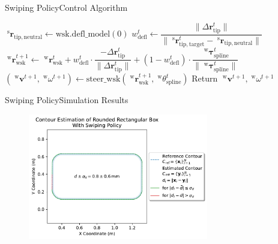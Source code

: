 \documentclass[AIRbeamer
,optEnglish
,optBiber
,optBibstyleAlphabetic
,optBeamerClassicFormat%
]{AIRlatex}
\begin{document}
\begin{frame}{Swiping Policy}{Control Algorithm}
\begin{algorithm}[H]
\begin{algorithmic}[1]
{                    \State \(\;^{\mathrm{s}}\boldsymbol{r}_{\mathrm{tip, neutral}} \gets \mathrm{wsk.defl\_model}(0)\)
                    \State \(w_{\mathrm{defl}}^{t} \gets \dfrac{\|\Delta\boldsymbol{r}_{\mathrm{tip}}^{t}\|}{\|\;^{\mathrm{s}}\boldsymbol{r}_{\mathrm{tip, target}}^{t} - \;^{\mathrm{s}}\boldsymbol{r}_{\mathrm{tip, neutral}}\|}\)
                    \State \colorbox{green!40}{\(\;^{\mathrm{w}}\boldsymbol{r}_{\mathrm{wsk}}^{t+1} \gets \;^{\mathrm{w}}\boldsymbol{r}_{\mathrm{wsk}}^{t} + w_{\mathrm{defl}}^{t} \cdot \dfrac{-\Delta\boldsymbol{r}_{\mathrm{tip}}^{t}}{\|\Delta\boldsymbol{r}_{\mathrm{tip}}^{t}\|} + (1 - w_{\mathrm{defl}}^{t}) \cdot \dfrac{\;^{\mathrm{w}}\boldsymbol{\tau}_{\mathrm{spline}}^{t}}{\|\;^{\mathrm{w}}\boldsymbol{\tau}_{\mathrm{spline}}^{t}\|}\)}
                    \State \((\;^{\mathrm{w}}\boldsymbol{v}^{t+1}, \;^{\mathrm{w}}\omega^{t+1}) \gets \mathrm{steer\_wsk}(\;^{\mathrm{w}}\boldsymbol{r}_{\mathrm{wsk}}^{t+1},\;^{\mathrm{w}}\theta_{\mathrm{spline}}^{t})\)
                    \State Return \(\;^{\mathrm{w}}\boldsymbol{v}^{t+1}, \;^{\mathrm{w}}\omega^{t+1}\)
                }
            \end{algorithmic}
        \end{algorithm}
    \end{frame}
    \begin{frame}{Swiping Policy}{Simulation Results}
        \begin{figure}[htb]
            \centering
            \includegraphics[width=0.7\textwidth]{figures/experiments/rounded-rectangular-box-swiping}
        \end{figure}
    \end{frame}
\end{document}
